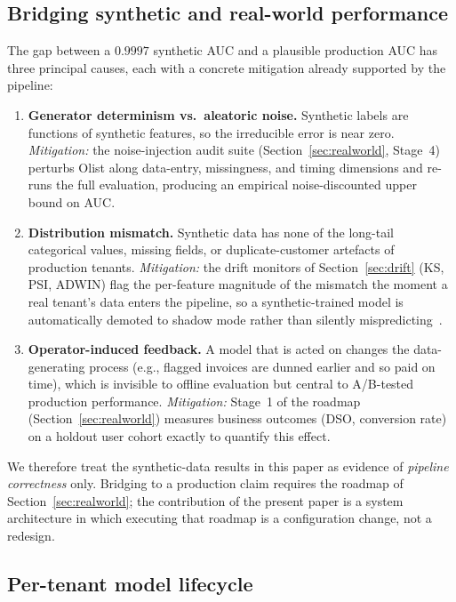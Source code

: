\documentclass[conference]{IEEEtran}
\begin{document}
\subsection{Bridging synthetic and real-world performance}
\label{sec:syn2real}

The gap between a $0.9997$ synthetic AUC and a plausible production AUC has
three principal causes, each with a concrete mitigation already supported
by the pipeline:

\begin{enumerate}
    \item \textbf{Generator determinism vs.\ aleatoric noise.} Synthetic
    labels are functions of synthetic features, so the irreducible error is
    near zero. \emph{Mitigation:} the noise-injection audit suite
    (Section~\ref{sec:realworld}, Stage~4) perturbs Olist along data-entry,
    missingness, and timing dimensions and re-runs the full evaluation,
    producing an empirical noise-discounted upper bound on AUC.
    \item \textbf{Distribution mismatch.} Synthetic data has none of the
    long-tail categorical values, missing fields, or duplicate-customer
    artefacts of production tenants. \emph{Mitigation:} the drift monitors
    of Section~\ref{sec:drift} (KS, PSI, ADWIN) flag the per-feature
    magnitude of the mismatch the moment a real tenant's data enters the
    pipeline, so a synthetic-trained model is automatically demoted to
    shadow mode rather than silently mispredicting~\cite{paleyes2022challenges}.
    \item \textbf{Operator-induced feedback.} A model that is acted on
    changes the data-generating process (e.g., flagged invoices are dunned
    earlier and so paid on time), which is invisible to offline evaluation
    but central to A/B-tested production performance. \emph{Mitigation:}
    Stage~1 of the roadmap (Section~\ref{sec:realworld}) measures business
    outcomes (DSO, conversion rate) on a holdout user cohort exactly to
    quantify this effect.
\end{enumerate}

We therefore treat the synthetic-data results in this paper as evidence of
\emph{pipeline correctness} only. Bridging to a production claim requires
the roadmap of Section~\ref{sec:realworld}; the contribution of the present
paper is a system architecture in which executing that roadmap is a
configuration change, not a redesign.

\subsection{Per-tenant model lifecycle}
\end{document}
